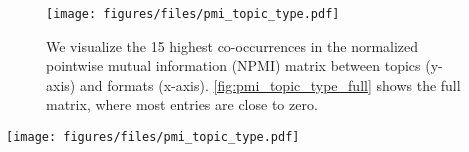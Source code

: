 \ificml
\begin{figure}
    \centering
    \icmlskip{0.1in}
    \texttt{[image: figures/files/pmi\_topic\_type.pdf]}
    \icmlskip{-0.05in}
    \caption{We visualize the 15 highest co-occurrences in the normalized pointwise mutual information (NPMI) matrix between topics (y-axis) and formats (x-axis). \autoref{fig:pmi_topic_type_full} shows the full matrix, where most entries are close to zero.
    }
    \icmlskip{-0.05in}
    \label{fig:pmi_topic_type}
\end{figure}
\else
    \centering
    \vskip -30pt
    \texttt{[image: figures/files/pmi\_topic\_type.pdf]}
    \icmlskip{-0.05in}
    \label{fig:pmi_topic_type}
\fi
